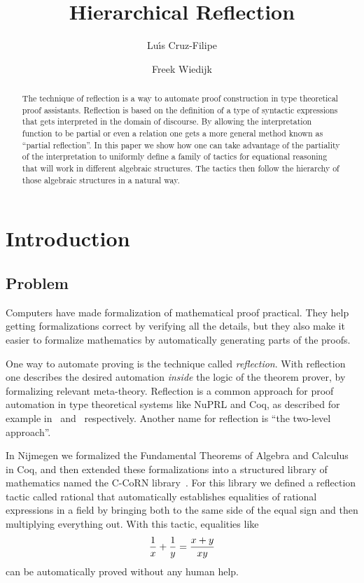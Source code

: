 \documentclass[runningheads]{llncs}
\newcommand{\tacticname}[1]{\textsf{#1}}
\newcommand{\rational}{\tacticname{rational}}
\begin{document}
\title{Hierarchical Reflection}
\author{Lu\'\i s Cruz-Filipe \and Freek Wiedijk}
\maketitle

\begin{abstract}
The technique of reflection is a way to automate proof construction
in type theoretical proof assistants.
Reflection is based on the definition of a type of syntactic expressions
that gets interpreted in the domain of discourse.
By allowing the interpretation function to be partial or even a relation
one gets a more general method known as ``partial reflection''.
In this paper we show how one can take advantage of the partiality of
the interpretation to uniformly define a family of tactics for equational
reasoning that will work in different algebraic structures.
The tactics then follow the hierarchy
of those algebraic structures in a natural way.
\end{abstract}

\section{Introduction}\label{intro} %

\subsection{Problem}

Computers have made formalization of mathematical proof practical.
They help getting formalizations correct by
verifying all the details,
but they also make it easier to formalize
mathematics by automatically generating parts of the proofs.

One way to automate proving is the technique called
\emph{reflection}.
With reflection one describes the desired automation \emph{inside} the logic
of the theorem prover, by formalizing relevant meta-theory.
Reflection is a common approach for proof automation in type theoretical
systems like NuPRL and Coq, as described for example
in~\cite{ACHA90} and~\cite{geu:wie:zwa:00} respectively.
Another name for reflection is ``the two-level approach''.

In Nijmegen we formalized the Fundamental Theorems of Algebra and
Calculus in Coq,
and then extended these formalizations into a structured library
of mathematics named the C-CoRN library~\cite{ccorn,lcf:geu:wie:04}.
For this library we defined a reflection tactic called {\rational}
that automatically establishes equalities of rational expressions in a field 
by bringing both to the same side of the equal sign and then
multiplying everything out.
With this tactic, equalities like
$${1\over x} + {1\over y} = {x + y\over xy}$$
can be automatically proved without any human help.
\end{document}

